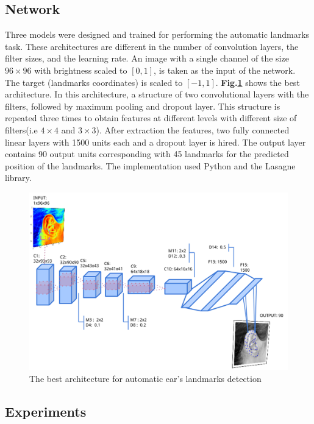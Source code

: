 \documentclass[12pt,a4paper]{article}
\begin{document}
\subsection{Network}
Three models were designed and trained for performing the automatic landmarks task. These architectures are different in the number of convolution layers, the filter sizes, and the learning rate. An image with a single channel of the size  $96 \times 96$ with brightness scaled to $[0,1]$, is taken as the input of the network. The target (landmarks coordinates) is scaled to $[-1,1]$. \textbf{Fig.\ref{1Econv}} shows the best architecture. In this architecture, a structure of two convolutional layers with the filters, followed by maximum pooling and dropout layer. This structure is repeated three times to obtain features at different levels with different size of filters(i.e $4 \times 4$ and $3 \times 3$). After extraction the features, two fully connected linear layers with 1500 units each and a dropout layer is hired. The output layer contains 90 output units corresponding with 45 landmarks for the predicted position of the landmarks. The implementation used Python and the Lasagne library\cite{lasagne}.
\begin{figure}[h!]
	\centering
	\includegraphics[scale=0.4]{images/ear_cnn}
	\caption{The best architecture for automatic ear's landmarks detection}
	\label{1Econv}
\end{figure}
\subsection{Experiments}
\end{document}
